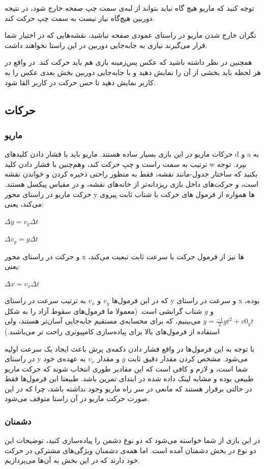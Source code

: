 \documentclass{utap}
\begin{document}
توجه کنید که ماریو هیچ گاه نباید بتواند از لبه‌ی سمت چپ صفحه خارج شود، در نتیجه دوربین هیچ‌گاه نیاز نیست به سمت چپ حرکت کند.

نگران خارج شدن ماریو در راستای عمودی صفحه نباشید، نقشه‌هایی که در اختیار شما قرار می‌گیرند نیازی به جابه‌جایی دوربین در این راستا نخواهند داشت.

همچنین در نظر داشته باشید که عکس پس‌زمینه بازی هم باید حرکت کند. در واقع در هر لحظه باید بخشی از آن را نمایش دهید و با جابه‌جایی دوربین بخش بعدی عکس را به کاربر نمایش دهید تا حس حرکت در کاربر القا شود.
	\subsection{حرکات}
		\subsubsection{ماریو}
حرکات ماریو در این بازی بسیار ساده هستند. ماریو باید با فشار دادن کلید‌های d و a به ترتیب به سمت راست و چپ حرکت کند، وهم‌چنین با فشار دادن کلید w بپرد. توجه بکنید که ساختار جدول-مانند نقشه، فقط به منظور راحتی ذخیره کردن و خواندن نقشه است، و حرکت‌های داخل بازی ریزدانه‌تر از خانه‌های نقشه، و در مقیاس پیکسل هستند. حرکت ماریو در راستای محور y ها همواره از فرمول های حرکت با شتاب ثابت پیروی می‌کند، یعنی:
	\begin{center}
		$\Delta y = v_y \Delta t$

		$\Delta v_y = g \Delta t$
	\end{center}
و حرکت در راستای محور x ها نیز از فرمول حرکت با سرعت ثابت تبعیت می‌کند، یعنی:
	\begin{center}
		$\Delta x = v_x \Delta t$
	\end{center}
که در این فرمول‌ها $v_y$ و $v_x$ به ترتیب سرعت در راستای y و سرعت در راستای x بوده، و $g$ شتاب گرانشی است. (معمولا ما فرمول‌های سقوط آزاد را به شکل
$y = \frac{-1}{2}gt^2 + v0_y t$
می‌بینیم، که برای محسابه‌ی مستقیم جابه‌جایی آسان‌تر هستند، ولی استفاده از فرمول‌های بالا برای پیاده‌سازی کامپیوتری راحت تر می‌باشند.)

با توجه به این فرمول‌ها در واقع فشار دادن دکمه‌ی پرش باعث ایجاد یک سرعت اولیه در راستای‌ y می‌شود. مشخص کردن مقدار دقیق ثابت $g$ و مقدار $v_x$ به عهده‌ی خود شما است، و لازم و کافی است که این مقادیر طوری انتخاب شوند که حرکت ماریو طبیعی بوده و مشابه لینک داده شده در ابتدای تمرین باشد. طبیعتا این فرمول‌ها فقط در حالتی برقرار هستند که مانعی در سر راه ماریو وجود نداشته باشد، چرا که در این صورت حرکت ماریو در آن راستا متوقف می‌شود.
		\subsubsection{دشمنان}
در این بازی از شما خواسته می‌شود که دو نوع دشمن را پیاده‌سازی کنید، توضیحات این دو نوع در بخش دشمنان آمده است. اما همه‌ی دشمنان ویژگی‌های مشترکی در حرکت خود دارند که در این بخش به آن‌ها می‌پردازیم.
\end{document}
